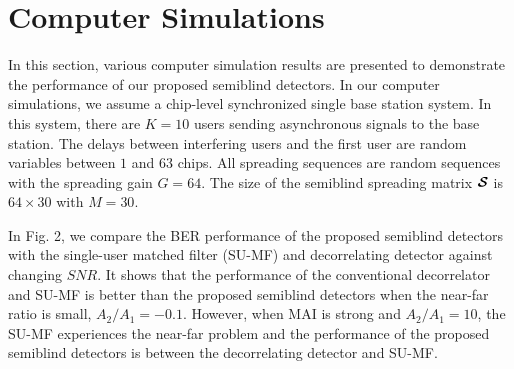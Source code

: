 \documentclass[a4paper,10pt,fleqn, twocolumn]{IEEETran}
\newcommand{\bcS}{{\mbox {\boldmath ${\cal S}$}}}
\begin{document}
\section{Computer Simulations}
In this section, various computer simulation results are presented
to demonstrate the performance of our proposed semiblind
detectors. In our computer simulations, we assume a chip-level
synchronized single base station system. In this system, there are
$K=10$ users sending asynchronous signals to the base station. The
delays between interfering users and the first user are random
variables between $1$ and $63$ chips. All spreading sequences are
random sequences with the spreading gain $G=64$. The size of the
semiblind spreading matrix $\bcS$ is $64\times30$ with $M=30$.
\begin{figure} \label{BER_SNR}
\end{figure}
In Fig. 2, we compare the BER performance of the proposed
semiblind detectors with the single-user matched filter (SU-MF)
and decorrelating detector against changing $SNR$. It shows that
the performance of the conventional decorrelator and SU-MF is
better than the proposed semiblind detectors when the near-far
ratio is small, $A_2/A_1=-0.1$. However, when MAI is strong and
$A_2/A_1=10$, the SU-MF experiences the near-far problem and the
performance of the proposed semiblind detectors is between the
decorrelating detector and SU-MF.
\begin{figure} \label{BER_NFR}
\end{figure}
\end{document}
